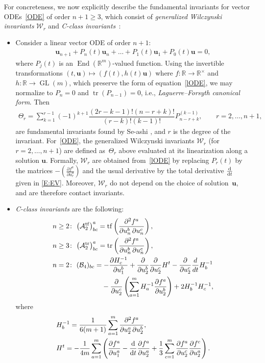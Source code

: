 \documentclass[10pt,a4paper]{amsart}
\DeclareMathOperator{\homo}{End}
\DeclareMathOperator{\tf}{tf}
\DeclareMathOperator{\tr}{tr}
\newcommand\bu{\mathbf{u}}
\newcommand{\R}{\mathbb{R}}
\newcommand\cA{\mathcal{A}}
\newcommand\cB{\mathcal{B}}
\newcommand\cW{\mathcal{W}}
\numberwithin{equation}{section}
\begin{document}
For concreteness, we now explicitly describe the fundamental invariants for vector ODEs~\eqref{ODE} of order $n+1 \ge 3$, which consist of {\em generalized Wilczynski invariants} $\cW_r$ \cite{Doubrov2008} and {\em C-class invariants}~\cite{DM2014, Medvedev2010,Medvedev2011}:
\begin{itemize}\itemsep=0pt
\item Consider a linear vector ODE of order $n+1$:
\begin{align} \label{lODE}
\bu_{n+1} + P_n(t)\bu_n+ \dots + P_1(t)\bu_1 + P_0(t)\bu = 0,
\end{align}
where $P_j(t)$ is an $\homo(\R^m)$-valued function. Using the invertible transformations $(t,\bu) \mapsto (f(t), h(t)\bu)$ where $f\colon \R \to \R^\times$ and $h\colon \R \to \operatorname{GL}(m)$, which preserve the form of equation~\eqref{lODE}, we may normalize to $P_n = 0$ and $\tr(P_{n-1}) = 0$, i.e., {\em Laguerre--Forsyth canonical form}. Then
\begin{align*}%
\Theta_{r} =
\sum_{k=1}^{r-1}(-1)^{k+1}\dfrac{(2r-k-1)!(n-r+k)!}{(r-k)!(k-1)!}P_{n-r+k}^{(k-1)}, \qquad r=2,\dots,n+1,
\end{align*}
 are fundamental invariants found by Se-ashi \cite{Se-ashi1988}, and $r$ is the degree of the invariant. For~\eqref{ODE}, the generalized Wilczynski invariants $\cW_r$ (for $r=2,\dots,n+1$) are defined as~$\Theta_r$ above evaluated at its linearization along a solution $\bu$. Formally, $\cW_r$ are obtained from~\eqref{lODE} by replacing $P_r(t)$ by the matrices $-\left(\frac{\partial f^a}{\partial u_r^b}\right)$ and the usual derivative by the total derivative $\frac{\rm d}{{\rm d}t}$ given in \eqref{E:EV}. Moreover, $\cW_r$ do not depend on the choice of solution~$\bu$, and are therefore contact invariants.
\item {\em C-class invariants} are the following:
\begin{align*}
&n \geq 2\colon\ {\bigl(\cA_2^{\tf}\bigr)}^a_{bc} =\tf\left( \frac{\partial^2{f}^a}{\partial{u_n^b}\, \partial{u_n^c}}\right), \\
&n \geq 3\colon\ {\bigl(\cA_2^{\tr}\bigr)}^a_{bc} =\tr\left( \frac{\partial^2{f}^a}{\partial{u_n^b}\, \partial{u_n^c}}\right), \\
&n = 2\colon\ (\cB_4)_{bc}= -\frac{\partial H_c^{-1}}{\partial u_{1}^b}+ \frac{\partial}{\partial u_2^b} \frac{\partial}{\partial u_2^c}{H^t}-\frac{\partial}{\partial u_2^c}\frac{d}{dt}{H^{-1}_b} \\
&\hphantom{n = 2\colon\ (\cB_4)_{bc}= }{} -\frac{\partial}{\partial u_2^c}\left(\sum_{a=1}^m H_a^{-1}\frac{\partial f^a}{\partial u_2^b}\right) + 2H^{-1}_b H^{-1}_c,
\end{align*}
where
\begin{align*}
&H_b^{-1} = \frac{1}{6(m+1)} \sum_{a=1}^m \frac{\partial^2{f}^a}{\partial{u_2^a}\, \partial{u_2^b}}, \\
&H^t = -\frac{1}{4m} \sum_{a=1}^m \left( \frac{\partial f^a}{\partial u_{1}^a}-\frac{{\rm d}}{{\rm d}t}\frac{\partial f^a}{\partial u_{2}^a}+ \frac{1}{3} \sum_{c=1}^m \frac{\partial f^a}{\partial u_2^c} \frac{\partial f^c}{\partial u_2^a}\right).
\end{align*}
\end{itemize}
\end{document}
